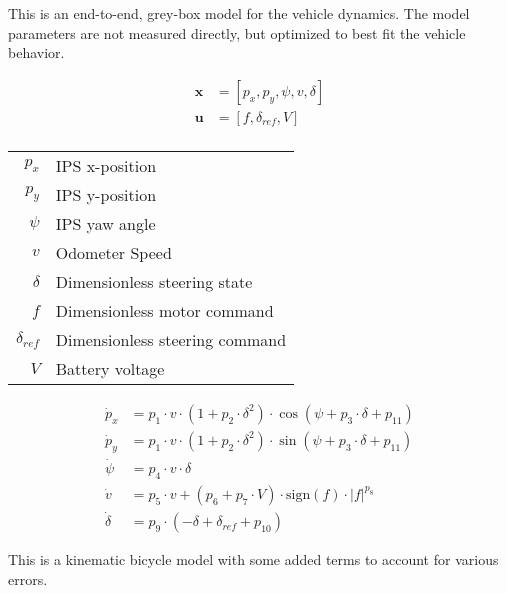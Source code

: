 
This is an end-to-end, grey-box model for the vehicle dynamics. The model parameters are not measured directly, but optimized to best fit the vehicle behavior.

\begin{align*}
\boldsymbol{x} &= [p_x, p_y, \psi, v, \delta] \\
\boldsymbol{u} &= [f, \delta_{ref}, V] \\ 
\end{align*}



\begin{center}
\begin{tabular}{ r | l }
 $p_x$ & IPS x-position  \\ 
 $p_y$ & IPS y-position   \\ 
 $\psi$ & IPS yaw angle  \\ 
 $v$ & Odometer Speed  \\ 
 $\delta$ & Dimensionless steering state \\ 
 $f$ & Dimensionless motor command  \\ 
 $\delta_{ref}$ & Dimensionless steering command  \\ 
 $V$ & Battery voltage  \\ 
\end{tabular}
\end{center}


\begin{align*}
\dot{p}_x &= p_1 \cdot v \cdot (1+p_2 \cdot \delta^2) \cdot \cos(\psi + p_3 \cdot \delta + p_{11}) \\
\dot{p}_y &= p_1 \cdot v \cdot (1+p_2 \cdot \delta^2) \cdot \sin(\psi + p_3 \cdot \delta + p_{11}) \\
\dot{\psi} &= p_4 \cdot v \cdot \delta \\
\dot{v} &= p_5 \cdot v + (p_6 + p_7 \cdot V) \cdot \text{sign}(f) \cdot |f|^{p_8} \\
\dot{\delta} &= p_9 \cdot (-\delta + \delta_{ref} + p_{10})
\end{align*}

This is a kinematic bicycle model with some added terms to account for various errors.

